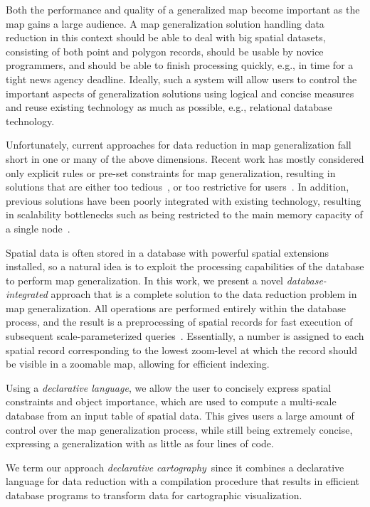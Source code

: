 \documentclass[11pt, oneside]{report}
\begin{document}
Both the performance and quality of a generalized map become important as the map gains a large audience. A map generalization solution handling data reduction in this context should be able to deal with big spatial datasets, consisting of both point and polygon records, should be usable by novice programmers, and should be able to finish processing quickly, e.g., in time for a tight news agency deadline. Ideally, such a system will allow users to control the important aspects of generalization solutions using logical and concise measures and reuse existing technology as much as possible, e.g., relational database technology.

Unfortunately, current approaches for data reduction in map generalization fall short in one or many of the above dimensions. Recent work has mostly considered only explicit rules or pre-set constraints for map generalization, resulting in solutions that are either too tedious~\cite{sld,mapnik}, or too restrictive for users~\cite{sarma2012fusiontables,nutanong2012multiresolution}. In addition, previous solutions have been poorly integrated with existing technology, resulting in scalability bottlenecks such as being restricted to the main memory capacity of a single node~\cite{sarma2012fusiontables}. 
 

Spatial data is often stored in a database with powerful spatial extensions installed, so a natural idea is to exploit the processing capabilities of the database to perform map generalization. In this work, we present a novel \emph{database-integrated} approach that is a complete solution to the data reduction problem in map generalization. All operations are performed entirely within the database process, and the result is a preprocessing of spatial records for fast execution of subsequent scale-parameterized queries~\cite{hilbert1891ueber}. Essentially, a number is assigned to each spatial record corresponding to the lowest zoom-level at which the record should be visible in a zoomable map, allowing for efficient indexing.

Using a \emph{declarative language}, we allow the user to concisely express spatial constraints and object importance, which are used to compute a multi-scale database from an input table of spatial data. This gives users a large amount of control over the map generalization process, while still being extremely concise, expressing a generalization with as little as four lines of code. 

We term our approach \emph{declarative cartography}\, since it combines a declarative language for data reduction with a compilation procedure that results in efficient database programs to transform data for cartographic visualization.
\end{document}
